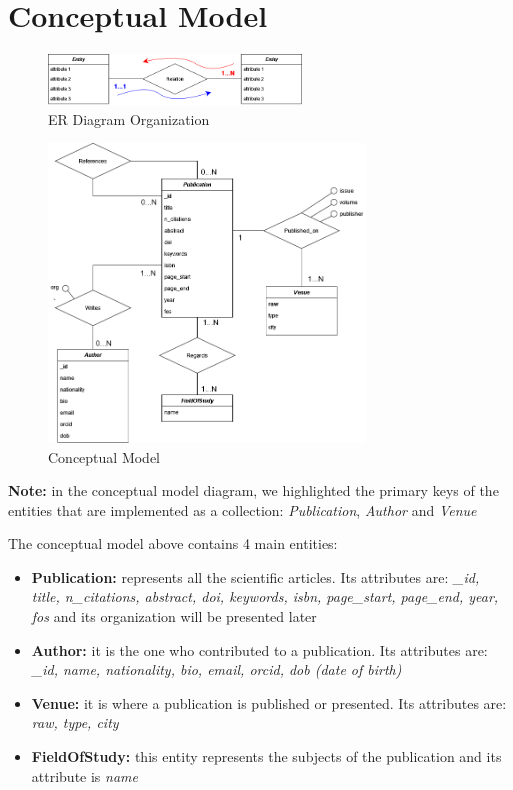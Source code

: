 \documentclass{Configuration_Files/PoliMi3i_thesis}
\begin{document}
\chapter{Conceptual Model}
\label{ch:conc_model}
\begin{figure}[H]
\centering
\includegraphics[width=0.6\textwidth]{legendaER.png}
\caption{ER Diagram Organization}
\label{fig:erleg}
\end{figure}
\begin{figure}[H]
\centering
\includegraphics[width=0.75\textwidth]{ERSpark.png}
\caption{Conceptual Model}
\label{fig:er}
\end{figure}

\textbf{Note:} in the conceptual model diagram, we highlighted the primary keys of the entities that are implemented as a collection:
\emph{Publication}, \emph{Author} and \emph{Venue}

The conceptual model above contains 4 main entities:
\begin{itemize}
    \item \textbf{Publication:} represents all the scientific articles. Its attributes are: \emph{\_id, title, n\_citations,
        abstract, doi, keywords, isbn, page\_start, page\_end, year, fos} and its
        organization will be presented later
    \item \textbf{Author:} it is the one who contributed to a publication. Its attributes are: \emph{\_id, name, nationality,
        bio, email, orcid, dob (date of birth)}
    \item \textbf{Venue:} it is where a publication is published or presented. Its attributes are: \emph{raw, type,
        city}
    \item \textbf{FieldOfStudy:} this entity represents the subjects of the publication and its attribute is \emph{name}
\end{itemize}
\end{document}
